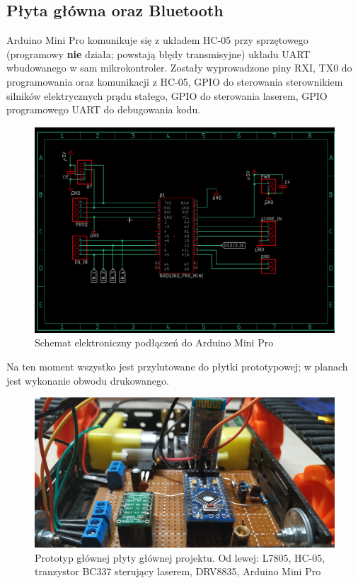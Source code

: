 \documentclass{report}
\begin{document}
		\subsection{Płyta główna oraz Bluetooth} 
		Arduino Mini Pro komunikuje się z układem HC-05 przy sprzętowego (programowy \textbf{nie} działa; powstają błędy transmisyjne) układu UART wbudowanego w sam mikrokontroler. Zostały wyprowadzone piny RXI, TX0 do programowania oraz komunikacji z HC-05, GPIO do sterowania sterownikiem silników elektrycznych prądu stałego, GPIO do sterowania laserem, GPIO programowego UART do debugowania kodu.
		 \begin{figure}[H]
			\centering
			\includegraphics[scale=0.4]{eagle_3.png}
			\caption{Schemat elektroniczny podłączeń do Arduino Mini Pro}
		\end{figure} 
		Na ten moment wszystko jest przylutowane do płytki prototypowej; w planach jest wykonanie obwodu drukowanego.
	    \begin{figure}[H]
			\centering
			\includegraphics[scale=0.1]{tank_2.jpg}
			\caption{Prototyp głównej płyty głównej projektu. Od lewej: L7805, HC-05, tranzystor BC337 sterujący laserem, DRV8835, Arduino Mini Pro}
		\end{figure}
\end{document}
